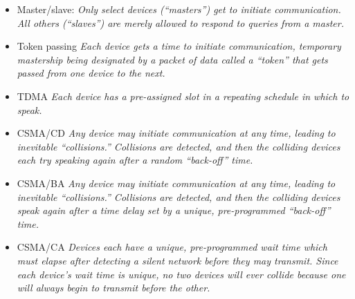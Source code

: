 





\begin{itemize}
\item{} Master/slave: {\it Only select devices (``masters'') get to initiate communication.  All others (``slaves'') are merely allowed to respond to queries from a master.} 
\item{} Token passing {\it Each device gets a time to initiate communication, temporary mastership being designated by a packet of data called a ``token'' that gets passed from one device to the next.}
\item{} TDMA {\it Each device has a pre-assigned slot in a repeating schedule in which to speak.}
\item{} CSMA/CD {\it Any device may initiate communication at any time, leading to inevitable ``collisions.''  Collisions are detected, and then the colliding devices each try speaking again after a random ``back-off'' time.}
\item{} CSMA/BA  {\it Any device may initiate communication at any time, leading to inevitable ``collisions.'' Collisions are detected, and then the colliding devices speak again after a time delay set by a unique, pre-programmed ``back-off'' time.} 
\item{} CSMA/CA  {\it Devices each have a unique, pre-programmed wait time which must elapse after detecting a silent network before they may transmit.  Since each device's wait time is unique, no two devices will ever collide because one will always begin to transmit before the other.}
\end{itemize}




